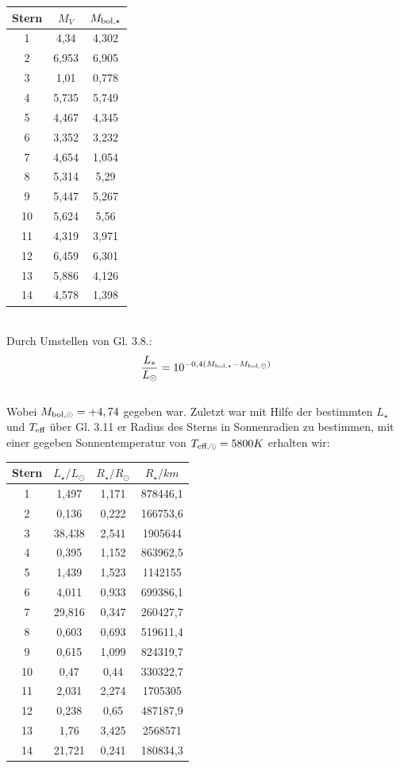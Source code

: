 \documentclass[12pt]{article}
\begin{document}
\newpage\noindent\begin{table}[!ht]
    \centering
    \begin{tabular}{c|c|c}
        Stern & $M_V$ & $M_{\textnormal{bol},\star}$ \\ \hline
        1 & 4,34 & 4,302 \\ 
        2 & 6,953 & 6,905 \\ 
        3 & 1,01 & 0,778 \\ 
        4 & 5,735 & 5,749 \\
        5 & 4,467 & 4,345 \\
        6 & 3,352 & 3,232 \\ 
        7 & 4,654 & 1,054 \\ 
        8 & 5,314 & 5,29 \\ 
        9 & 5,447 & 5,267 \\ 
        10 & 5,624 & 5,56 \\ 
        11 & 4,319 & 3,971 \\ 
        12 & 6,459 & 6,301 \\ 
        13 & 5,886 & 4,126 \\ 
        14 & 4,578 & 1,398 \\ 
    \end{tabular}
\end{table}\\
Durch Umstellen von Gl. 3.8.:
\[\frac{L_*}{L_{\odot}} = 10^{-0,4(M_{\textnormal{bol},\star}-M_{\textnormal{bol},\odot})}\]\\
Wobei $M_{\textnormal{bol},\odot} = +4,74$ gegeben war. Zuletzt war mit Hilfe der bestimmten $L_\star$ und $T_{\textnormal{eff}}$ über Gl. 3.11 er Radius des Sterns in Sonnenradien zu bestimmen, mit einer gegeben Sonnentemperatur von $T_{\textnormal{eff},\odot} = 5800K$ erhalten wir:
\begin{table}[!ht]
    \centering
    \begin{tabular}{c|c|c|c}
        Stern & $L_\star / L_\odot$ &$R_\star / R_\odot$& $R_\star / km$ \\ \hline
        1 & 1,497 & 1,171 & 878446,1 \\ 
        2 & 0,136 & 0,222 & 166753,6 \\ 
        3 & 38,438 & 2,541 & 1905644 \\ 
        4 & 0,395 & 1,152 & 863962,5 \\ 
        5 & 1,439 & 1,523 & 1142155 \\ 
        6 & 4,011 & 0,933 & 699386,1 \\ 
        7 & 29,816 & 0,347 & 260427,7 \\ 
        8 & 0,603 & 0,693 & 519611,4 \\ 
        9 & 0,615 & 1,099 & 824319,7 \\ 
        10 & 0,47 & 0,44 & 330322,7 \\ 
        11 & 2,031 & 2,274 & 1705305 \\ 
        12 & 0,238 & 0,65 & 487187,9 \\ 
        13 & 1,76 & 3,425 & 2568571 \\ 
        14 & 21,721 & 0,241 & 180834,3 \\ 
    \end{tabular}
\end{table}
\end{document}
